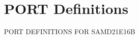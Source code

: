 \hypertarget{group___s_a_m_d21_e16_b__port}{}\section{P\+O\+RT Definitions}
\label{group___s_a_m_d21_e16_b__port}
P\+O\+RT D\+E\+F\+I\+N\+I\+T\+I\+O\+NS F\+OR S\+A\+M\+D21\+E16B 